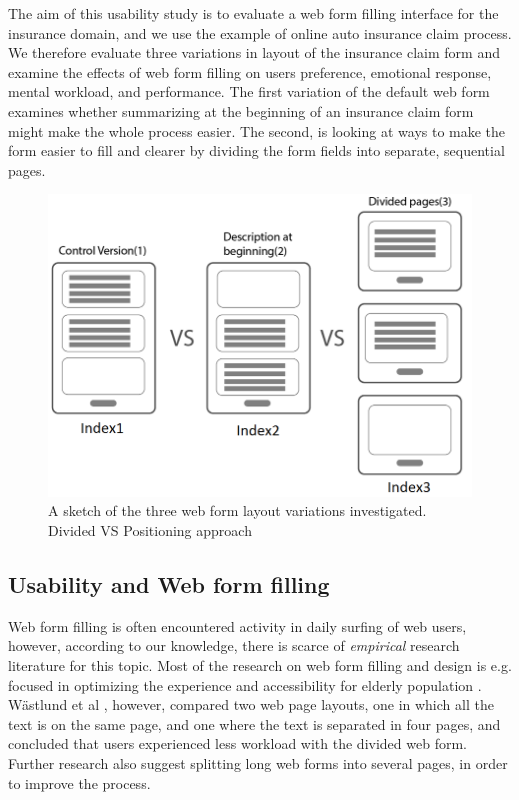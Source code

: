 \documentclass[../main/Feedback.tex]{subfiles}
\begin{document}
The aim of this usability study is to evaluate a web form filling interface for the insurance domain, and we use the example of online auto insurance claim process.
We therefore evaluate three variations in layout of the insurance claim form and examine the effects of web form filling on users preference, emotional response, mental workload, and performance.
The first variation of the default web form examines whether summarizing at the beginning of an insurance claim form might make the whole process easier.
The second, is looking at ways to make the form easier to fill and clearer by dividing the form fields into separate, sequential pages.
\begin{figure} [h]
	\centering
	\includegraphics[width=\linewidth]{../figures/layout-variations}
	\caption{A sketch of the three web form layout variations investigated. Divided VS Positioning approach}
	\label{fig:layout-variations}
\end{figure}

\subsection{Usability and Web form filling}	
Web form filling is often encountered activity in daily surfing of web users, however, according to our knowledge, there is scarce of \emph{empirical} research literature for this topic.
Most of the research on web form filling and design is e.g. focused in optimizing the experience and accessibility for elderly population \cite{sayago2012selective,chadwick2003web,lines2006online,sayago2007some}.
W{\"a}stlund et al \cite{Wastlund20081229}, however, compared two web page layouts, one in which all the text is on the same page, and one where the text is separated in four pages, and concluded that users experienced less workload with the divided web form.
Further research \cite{jarrett2009forms,wroblewski2008web} also suggest splitting long web forms into several pages, in order to improve the process.
\end{document}
